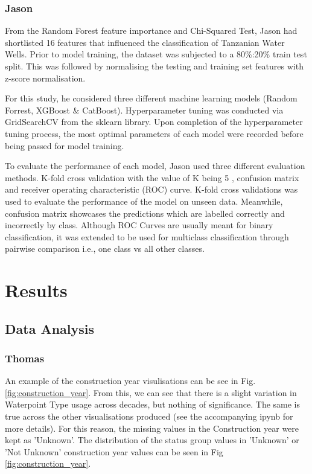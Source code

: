 \documentclass[conference]{IEEEtran}
\begin{document}
\subsubsection{Jason}

From the Random Forest feature importance and Chi-Squared Test, Jason had shortlisted 16 features that influenced the classification of Tanzanian Water Wells. Prior to model training, the dataset was subjected to a 80\%:20\% train test split. This was followed by normalising the testing and training set features with z-score normalisation.

For this study, he considered three different machine learning models  (Random Forrest, XGBoost \& CatBoost). Hyperparameter tuning was conducted via GridSearchCV \cite{gridsearch} from the sklearn library. Upon completion of the hyperparameter tuning process, the most optimal parameters of each model were recorded before being passed for model training. 

To evaluate the performance of each model, Jason used three different evaluation methods. K-fold cross validation with the value of K being 5 , confusion matrix and receiver operating characteristic (ROC) curve. K-fold cross validations was used to evaluate the performance of the model on unseen data. Meanwhile, confusion matrix showcases the predictions which are labelled correctly and incorrectly by class. Although ROC Curves are usually meant for binary classification, it was extended to  be used for multiclass classification through pairwise comparison i.e., one class vs all other classes.   

\section{Results} \label{ref:results}

\subsection{Data Analysis}

\subsubsection{Thomas}

An example of the construction year visulisations can be see in Fig. \ref{fig:construction_year}. From this, we can see that there is a slight variation in Waterpoint Type usage across decades, but nothing of significance. The same is true across the other visualisations produced (see the accompanying ipynb for more details). For this reason, the missing values in the Construction year were kept as 'Unknown'. The distribution of the status group values in 'Unknown' or 'Not Unknown' construction year values can be seen in Fig \ref{fig:construction_year}.
\end{document}
